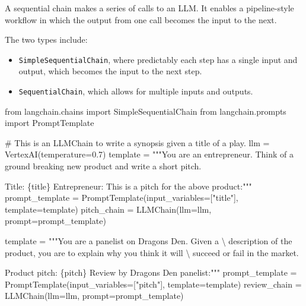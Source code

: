 \documentclass[
  letterpaper,
  DIV=11,
  numbers=noendperiod]{scrreprt}
\newenvironment{Shaded}{\begin{snugshade}}{\end{snugshade}}
\newcommand{\CharTok}[1]{\textcolor[rgb]{0.13,0.47,0.30}{#1}}
\newcommand{\CommentTok}[1]{\textcolor[rgb]{0.37,0.37,0.37}{#1}}
\newcommand{\FloatTok}[1]{\textcolor[rgb]{0.68,0.00,0.00}{#1}}
\newcommand{\ImportTok}[1]{\textcolor[rgb]{0.00,0.46,0.62}{#1}}
\newcommand{\NormalTok}[1]{\textcolor[rgb]{0.00,0.23,0.31}{#1}}
\newcommand{\OperatorTok}[1]{\textcolor[rgb]{0.37,0.37,0.37}{#1}}
\newcommand{\SpecialCharTok}[1]{\textcolor[rgb]{0.37,0.37,0.37}{#1}}
\newcommand{\StringTok}[1]{\textcolor[rgb]{0.13,0.47,0.30}{#1}}
\begin{document}
A sequential chain makes a series of calls to an LLM. It enables a
pipeline-style workflow in which the output from one call becomes the
input to the next.

The two types include:

\begin{itemize}
\item
  \texttt{SimpleSequentialChain}, where predictably each step has a
  single input and output, which becomes the input to the next step.
\item
  \texttt{SequentialChain}, which allows for multiple inputs and
  outputs.
\end{itemize}

\begin{Shaded}
\begin{Highlighting}[]
\ImportTok{from}\NormalTok{ langchain.chains }\ImportTok{import}\NormalTok{ SimpleSequentialChain}
\ImportTok{from}\NormalTok{ langchain.prompts }\ImportTok{import}\NormalTok{ PromptTemplate}
\end{Highlighting}
\end{Shaded}

\begin{Shaded}
\begin{Highlighting}[]
\CommentTok{\# This is an LLMChain to write a synopsis given a title of a play.}
\NormalTok{llm }\OperatorTok{=}\NormalTok{ VertexAI(temperature}\OperatorTok{=}\FloatTok{0.7}\NormalTok{)}
\NormalTok{template }\OperatorTok{=} \StringTok{"""You are an entrepreneur. Think of a ground breaking new product and write a short pitch.}

\StringTok{Title: }\SpecialCharTok{\{title\}}
\StringTok{Entrepreneur: This is a pitch for the above product:"""}
\NormalTok{prompt\_template }\OperatorTok{=}\NormalTok{ PromptTemplate(input\_variables}\OperatorTok{=}\NormalTok{[}\StringTok{"title"}\NormalTok{], template}\OperatorTok{=}\NormalTok{template)}
\NormalTok{pitch\_chain }\OperatorTok{=}\NormalTok{ LLMChain(llm}\OperatorTok{=}\NormalTok{llm, prompt}\OperatorTok{=}\NormalTok{prompt\_template)}
\end{Highlighting}
\end{Shaded}

\begin{Shaded}
\begin{Highlighting}[]
\NormalTok{template }\OperatorTok{=} \StringTok{"""You are a panelist on Dragon\textquotesingle{}s Den. Given a }\CharTok{\textbackslash{}}
\StringTok{description of the product, you are to explain why you think it will }\CharTok{\textbackslash{}}
\StringTok{succeed or fail in the market.}

\StringTok{Product pitch: }\SpecialCharTok{\{pitch\}}
\StringTok{Review by Dragon\textquotesingle{}s Den panelist:"""}
\NormalTok{prompt\_template }\OperatorTok{=}\NormalTok{ PromptTemplate(input\_variables}\OperatorTok{=}\NormalTok{[}\StringTok{"pitch"}\NormalTok{], template}\OperatorTok{=}\NormalTok{template)}
\NormalTok{review\_chain }\OperatorTok{=}\NormalTok{ LLMChain(llm}\OperatorTok{=}\NormalTok{llm, prompt}\OperatorTok{=}\NormalTok{prompt\_template)}
\end{Highlighting}
\end{Shaded}
\end{document}
